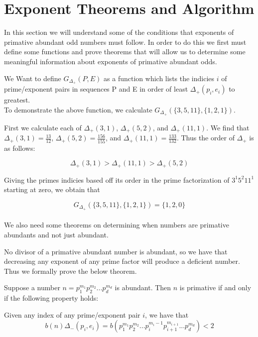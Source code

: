 \documentclass[../paper.tex]{subfiles}
\begin{document}
\section{Exponent Theorems and Algorithm}

In this section we will understand some of the conditions that
exponents of primative abundant odd numbers must follow. In order
to do this we first must define some functions and prove theorems 
that will allow us to determine some meaningful information about
exponents of primative abundant odds.

We Want to define $G_{\Delta_{+}}(P,E)$ as a function which lists
the indicies $i$ of prime/exponent pairs in sequences P and E
in order of least $\Delta_{+}(p_i, e_i)$ to greatest.
\\

To demonstrate the above function, we calculate 
$G_{\Delta_{+}}(\{3,5,11\}, \{1,2,1\})$.

First we calculate each of $\Delta_{+}(3,1)$, $\Delta_{+}(5,2)$, 
and $\Delta_{+}(11,1)$. We find that 
$\Delta_{+}(3,1) = \frac{13}{12}$,
$\Delta_{+}(5,2) = \frac{156}{155}$, and
$\Delta_{+}(11,1)= \frac{133}{132}$.
Thus the order of $\Delta_{+}$ is as follows:

$$ \Delta_{+}(3,1) > \Delta_{+}(11,1) > \Delta_{+}(5,2)$$

Giving the primes indicies based off its order in the prime
factorization of $3^1 5^2 11^1$ starting at zero, we obtain that

$$G_{\Delta_{+}}(\{3,5,11\}, \{1,2,1\}) = \{1,2,0\}$$
\\

We also need some theorems on determining when numbers are 
primative abundants and not just abundant.

No divisor of a primative abundant number is abundant, so 
we have that decreasing any exponent of any prime factor will
produce a deficient number. Thus we formally prove the below
theorem.

\begin{theorem}\label{del_minus_thm}
Suppose a number $n = p_1^{m_1} p_2^{m_2} ... p_d^{m_d}$ is 
abundant. Then $n$ is primative if and only if the 
following property holds:

Given any index of any prime/exponent pair $i$, we have that
$$b(n) \Delta_{-}(p_i, e_i) = b(p_1^{m_1} p_2^{m_2} ...  
p_i^{m_i - 1} p_{i+1}^{m_{i+1}}... p_d^{m_d}) < 2$$
\end{theorem}
\end{document}
